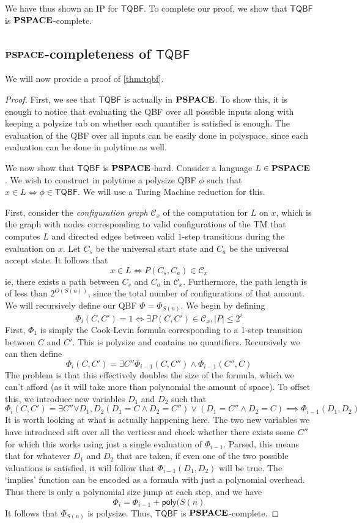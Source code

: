 We have thus shown an IP for $\mathsf{TQBF}$. To complete our proof, we show that $\mathsf{TQBF}$ is $\mathbf{PSPACE}$-complete.

\subsection{$\mathbf{PSPACE}$-completeness of $\mathsf{TQBF}$}

We will now provide a proof of \ref{thm:tqbf}.

\begin{proof}
	First, we see that $\mathsf{TQBF}$ is actually in $\mathbf{PSPACE}$. To show this, it is enough to notice that evaluating the QBF over all possible inputs along with keeping a polysize tab on whether each quantifier is satisfied is enough. The evaluation of the QBF over all inputs can be easily done in polyspace, since each evaluation can be done in polytime as well.
	
	We now show that $\mathsf{TQBF}$ is $\mathbf{PSPACE}$-hard. Consider a language $L\in\mathbf{PSPACE}$. We wish to construct in polytime a polysize QBF $\phi$ such that $x\in L\iff\phi\in\mathsf{TQBF}$. We will use a Turing Machine reduction for this.
	
	First, consider the \textit{configuration graph} $\mathcal{C}_x$ of the computation for $L$ on $x$, which is the graph with nodes corresponding to valid configurations of the TM that computes $L$ and directed edges between valid $1$-step transitions during the evaluation on $x$. Let $C_s$ be the universal start state and $C_a$ be the universal accept state. It follows that
	$$x\in L\iff P(C_s, C_a)\in\mathcal{C}_x$$
	ie, there exists a path between $C_s$ and $C_a$ in $\mathcal{C}_x$. Furthermore, the path length is of less than $2^{O(S(n))}$, since the total number of configurations of that amount. We will recursively define our QBF $\Phi=\Phi_{S(n)}$. We begin by defining
	$$\Phi_i(C,C')=1\iff\exists P(C, C')\in\mathcal{C}_x, |P|\leq 2^i$$ 
	First, $\Phi_1$ is simply the Cook-Levin formula corresponding to a 1-step transition between $C$ and $C'$. This is polysize and contains no quantifiers. Recursively we can then define
	$$\Phi_i(C, C')=\exists C''\Phi_{i-1}(C, C'')\wedge\Phi_{i-1}(C'', C)$$
	The problem is that this effectively doubles the size of the formula, which we can't afford (as it will take more than polynomial the amount of space). To offset this, we introduce new variables $D_1$ and $D_2$ such that 
	$$\Phi_i(C, C')=\exists C''\forall D_1, D_2 (D_1=C\wedge D_2=C'')\vee (D_1=C''\wedge D_2=C)\implies \Phi_{i-1}(D_1, D_2)$$
	It is worth looking at what is actually happening here. The two new variables we have introduced sift over all the vertices and check whether there exists some $C''$ for which this works using just a single evaluation of $\Phi_{i-1}$. Parsed, this means that for whatever $D_1$ and $D_2$ that are taken, if even one of the two possible valuations is satisfied, it will follow that $\Phi_{i-1}(D_1, D_2)$ will be true. The `implies' function can be encoded as a formula with just a polynomial overhead. Thus there is only a polynomial size jump at each step, and we have
	$$\Phi_i=\Phi_{i-1}+\mathsf{poly}(S(n)$$
	It follows that $\Phi_{S(n)}$ is polysize. Thus, $\mathsf{TQBF}$ is $\mathbf{PSPACE}$-complete.
\end{proof}

